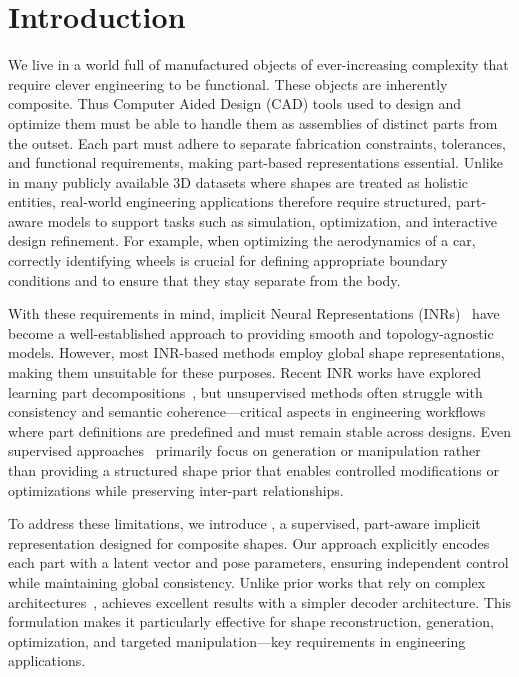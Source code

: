 
\section{Introduction}
\label{sec:intro}


We live in a world full of manufactured objects of ever-increasing complexity that require clever engineering to be functional. These objects are inherently composite. Thus Computer Aided Design (CAD) tools used to design and optimize them must be able to handle them as assemblies of distinct parts from the outset. Each part must adhere to separate fabrication constraints, tolerances, and functional requirements, making part-based representations essential. Unlike in many publicly available 3D datasets where shapes are treated as holistic entities, real-world engineering applications therefore require structured, part-aware models to support tasks such as simulation, optimization, and interactive design refinement. For example, when optimizing the aerodynamics of a car, correctly identifying wheels is crucial for defining appropriate boundary conditions and to ensure that they stay separate from the body.

With these requirements in mind, implicit Neural Representations (INRs)~\cite{Park19c, Mescheder19, Chen19c} have become a well-established approach to providing smooth and topology-agnostic models. However, most INR-based methods employ global shape representations, making them unsuitable for these purposes. Recent INR works have explored learning part decompositions~\cite{Hertz22,Chen24b}, but unsupervised methods often struggle with consistency and semantic coherence—critical aspects in engineering workflows where part definitions are predefined and must remain stable across designs. Even supervised approaches~\cite{Wu20c,Deng22b,Li24c} primarily focus on generation or manipulation rather than providing a structured shape prior that enables controlled modifications or optimizations while preserving inter-part relationships.

To address these limitations, we introduce \PSDF{}, a supervised, part-aware implicit representation designed for composite shapes. Our approach explicitly encodes each part with a latent vector and pose parameters, ensuring independent control while maintaining global consistency. Unlike prior works that rely on complex architectures~\cite{Deng22b,Hertz22,Li24c}, \PSDF{} achieves excellent results with a simpler decoder architecture. This formulation makes it particularly effective for shape reconstruction, generation, optimization, and targeted manipulation—key requirements in engineering applications.

